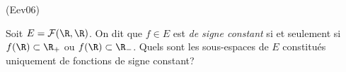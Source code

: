 \begin{tiny}(Eev06)\end{tiny} Soit $E = \mathcal{F}(\R,\R)$. On dit que $f\in E$ est \emph{de signe constant} si et seulement si $f(\R)\subset \R_+$ ou $f(\R)\subset \R_-$.\newline
Quels sont les sous-espaces de $E$ constitués uniquement de fonctions de signe constant?
